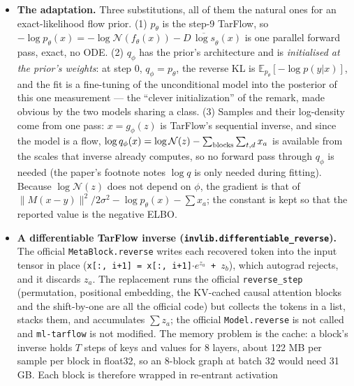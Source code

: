 \documentclass[11pt]{article}
\begin{document}
\begin{itemize}
        NF prior with this procedure was unstable at $10^{-5}$ and remark
        that a ``clever initialization might make DPI optimization more
        stable with an NF prior''.
  \item \textbf{The adaptation.} Three substitutions, all of them the
        natural ones for an exact-likelihood flow prior. (1) $p_\theta$ is the
        step-9 TarFlow, so $-\log p_\theta(x) = -\log\mathcal{N}(f_\theta(x))
        - D\,\overline{\log s}_\theta(x)$ is one parallel forward pass, exact,
        no ODE. (2) $q_\phi$ has the prior's architecture and is
        \emph{initialised at the prior's weights}: at step 0, $q_\phi =
        p_\theta$, the reverse KL is $\mathbb{E}_{p_\theta}[-\log p(y|x)]$,
        and the fit is a fine-tuning of the unconditional model into the
        posterior of this one measurement --- the ``clever initialization''
        of the remark, made obvious by the two models sharing a class.
        (3) Samples and their log-density come from one pass:
        $x = g_\phi(z)$ is TarFlow's sequential inverse, and since the model
        is a flow, $\log q_\phi(x) = \log\mathcal{N}(z) - \sum_{\rm blocks}
        \sum_{t,d} x_a$ is available from the scales that inverse already
        computes, so no forward pass through $q_\phi$ is needed (the paper's
        footnote notes $\log q$ is only needed during fitting). Because
        $\log\mathcal{N}(z)$ does not depend on $\phi$, the gradient is that
        of $\|M(x-y)\|^2/2\sigma^2 - \log p_\theta(x) - \sum x_a$; the
        constant is kept so that the reported value is the negative ELBO.
  \item \textbf{A differentiable TarFlow inverse
        (\texttt{invlib.differentiable\_reverse}).} The official
        \texttt{MetaBlock.reverse} writes each recovered token into the
        input tensor in place (\texttt{x[:, i+1] = x[:, i+1]$\cdot e^{z_a}$
        + $z_b$}), which autograd rejects, and it discards $z_a$. The
        replacement runs the official \texttt{reverse\_step} (permutation,
        positional embedding, the KV-cached causal attention blocks and the
        shift-by-one are all the official code) but collects the tokens in a
        list, stacks them, and accumulates $\sum z_a$; the official
        \texttt{Model.reverse} is not called and \texttt{ml-tarflow} is not
        modified. The memory problem is the cache: a block's inverse holds
        $T$ steps of keys and values for 8 layers, about 122 MB per sample
        per block in float32, so an 8-block graph at batch 32 would need 31
        GB. Each block is therefore wrapped in re-entrant activation

\end{itemize}
\end{document}
